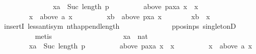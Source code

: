 \begin{isabellebody}
\ \ \ \ \ \ \isamarkupfalse%
\isanewline
\ \ \ \ \ \ \ \ {\isachardoublequoteopen}xa\ {\isacharless}{\kern0pt}\ Suc\ {\isacharparenleft}{\kern0pt}length\ p{\isacharparenright}{\kern0pt}{\isachardoublequoteclose}\ \isanewline
\ \ \ \ \ \ \ \ {\isachardoublequoteopen}above\ {\isacharparenleft}{\kern0pt}{\isacharparenleft}{\kern0pt}p{\isacharat}{\kern0pt}{\isacharbrackleft}{\kern0pt}a{\isacharbrackright}{\kern0pt}{\isacharparenright}{\kern0pt}{\isacharbang}{\kern0pt}xa{\isacharparenright}{\kern0pt}\ x\ {\isacharequal}{\kern0pt}\ {\isacharbraceleft}{\kern0pt}x{\isacharbraceright}{\kern0pt}{\isachardoublequoteclose}\ \isanewline
\ \ \ \ \ \ \ \ {\isachardoublequoteopen}x\ {\isasymnotin}\ above\ a\ x{\isachardoublequoteclose}\ \isanewline
\ \ \ \ \ \ \ \ {\isachardoublequoteopen}xb\ {\isasymin}\ above\ {\isacharparenleft}{\kern0pt}p{\isacharbang}{\kern0pt}xa{\isacharparenright}{\kern0pt}\ x{\isachardoublequoteclose}\isanewline
\ \ \ \ \ \ \isamarkupfalse%
\ {\isachardoublequoteopen}xb\ {\isacharequal}{\kern0pt}\ x{\isachardoublequoteclose}\isanewline
\ \ \ \ \ \ \ \ \isamarkupfalse%
\ insertI{}\ less{\isacharunderscore}{\kern0pt}antisym\ nth{\isacharunderscore}{\kern0pt}append{\isacharunderscore}{\kern0pt}length\isanewline
\ \ \ \ \ \ \ \ \ \ \ \ \ \ p{\isacharunderscore}{\kern0pt}pos{\isacharunderscore}{\kern0pt}in{\isacharunderscore}{\kern0pt}ps\ singletonD\isanewline
\ \ \ \ \ \ \ \ \isamarkupfalse%
\ metis\isanewline
\ \ \ \ \isamarkupfalse%
\isanewline
\ \ \ \ \ \ \isamarkupfalse%
\isanewline
\ \ \ \ \ \ \ \ xa\ {\isacharcolon}{\kern0pt}{\isacharcolon}{\kern0pt}\ nat\isanewline
\ \ \ \ \ \ \isamarkupfalse%
\isanewline
\ \ \ \ \ \ \ \ {\isachardoublequoteopen}xa\ {\isacharless}{\kern0pt}\ Suc\ {\isacharparenleft}{\kern0pt}length\ p{\isacharparenright}{\kern0pt}{\isachardoublequoteclose}\ \isanewline
\ \ \ \ \ \ \ \ {\isachardoublequoteopen}above\ {\isacharparenleft}{\kern0pt}{\isacharparenleft}{\kern0pt}p{\isacharat}{\kern0pt}{\isacharbrackleft}{\kern0pt}a{\isacharbrackright}{\kern0pt}{\isacharparenright}{\kern0pt}{\isacharbang}{\kern0pt}xa{\isacharparenright}{\kern0pt}\ x\ {\isacharequal}{\kern0pt}\ {\isacharbraceleft}{\kern0pt}x{\isacharbraceright}{\kern0pt}{\isachardoublequoteclose}\ \isanewline
\ \ \ \ \ \ \ \ {\isachardoublequoteopen}x\ {\isasymnotin}\ above\ a\ x{\isachardoublequoteclose}\isanewline
\ \ \ \ \ \ \isamarkupfalse%

\end{isabellebody}
